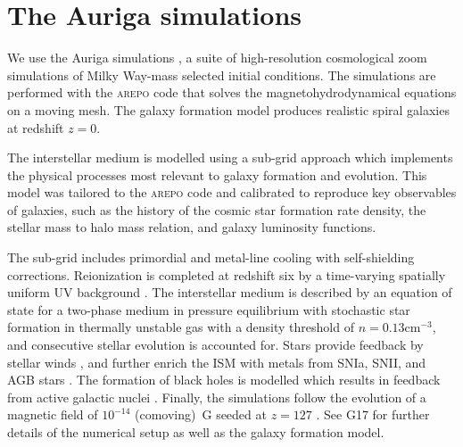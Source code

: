 \documentclass[a4paper,fleqn,usenatbib]{mnras}
\begin{document}
\section{The Auriga simulations}
\label{sec:auriga}
We use the Auriga simulations \citep[][hereafter G17]{2017MNRAS.467..179G}, a
suite of high-resolution cosmological zoom simulations of Milky Way-mass
selected initial conditions. The simulations are performed with the \textsc{arepo} 
\citep{2010MNRAS.401..791S, 2016MNRAS.455.1134P} code that solves the 
magnetohydrodynamical equations on a moving mesh. The galaxy formation model 
produces realistic spiral galaxies at redshift $z=0$.

The interstellar medium is modelled using a sub-grid approach which implements
the physical processes most relevant to galaxy formation and evolution.
This model was tailored to the \textsc{arepo} code and calibrated to reproduce
key observables of galaxies, such as the history of the cosmic star formation rate
density, the stellar mass to halo mass relation, and galaxy luminosity functions.

The sub-grid includes primordial and metal-line cooling with self-shielding
corrections. Reionization is completed at redshift six by a time-varying
spatially uniform UV background \citep{2009ApJ...703.1416F, 2013MNRAS.436.3031V}.
The interstellar medium is described by an equation of state for a two-phase medium
in pressure equilibrium \citep{2003MNRAS.339..289S} with stochastic star formation
in thermally unstable gas with a density threshold of $n = 0.13 \text{cm}^{-3}$,
and consecutive stellar evolution is accounted for. Stars provide feedback by
stellar winds \citep{2014MNRAS.437.1750M, 2017MNRAS.467..179G}, and further
enrich the ISM with metals from SNIa, SNII, and AGB stars \citep{2013MNRAS.436.3031V}.
The formation of black holes is modelled which results in feedback from active
galactic nuclei \citep{2005MNRAS.361..776S, 2014MNRAS.437.1750M, 2017MNRAS.467..179G}.
Finally, the simulations follow the evolution of a magnetic field of $10^{-14}$
(comoving)~G seeded at $z = 127$ \citep{2013MNRAS.432..176P, 2014ApJ...783L..20P}.
See G17 for further details of the numerical setup as well as the galaxy formation
model.
\end{document}

